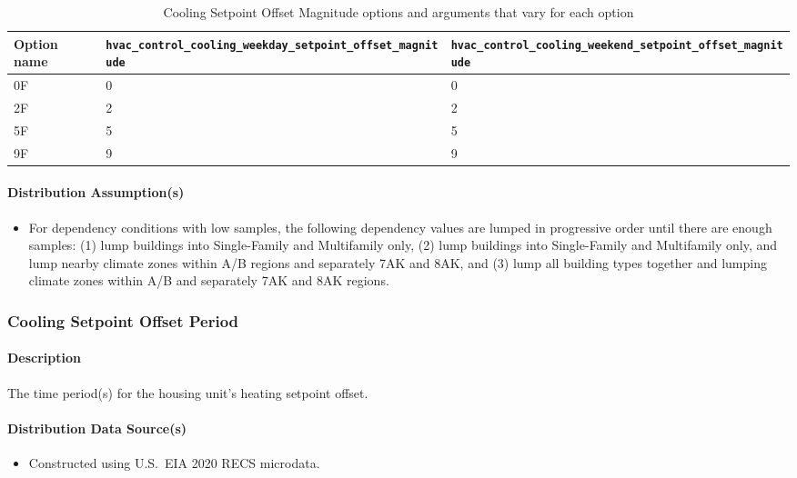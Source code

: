 \begin{longtable}[]{ |p{}|p{4cm}|p{4cm}| }
\caption{Cooling Setpoint Offset Magnitude options and arguments that vary for each option} \label{table:hc_opt_cl_stp_mag} \\  
\toprule\noalign{}
Option name &
\texttt{hvac\_control\_cooling\_weekday\_setpoint\_offset\_magnitude} &
\texttt{hvac\_control\_cooling\_weekend\_setpoint\_offset\_magnitude} \\
\midrule\noalign{}
\endhead
\bottomrule\noalign{}
\endlastfoot
0F & 0 & 0 \\
2F & 2 & 2 \\
5F & 5 & 5 \\
9F & 9 & 9 \\
\end{longtable}

\paragraph{Distribution Assumption(s)}
\begin{itemize}
    \item For dependency conditions with low samples, the following dependency values are lumped in progressive order until there are enough samples: (1) lump buildings into Single-Family and Multifamily only, (2) lump buildings into Single-Family and Multifamily only, and lump nearby climate zones within A/B regions and separately 7AK and 8AK, and (3) lump all building types together and lumping climate zones within A/B and separately 7AK and 8AK regions.
\end{itemize}

\subsubsection{Cooling Setpoint Offset Period}
\paragraph{Description}
The time period(s) for the housing unit's heating setpoint offset.

\paragraph{Distribution Data Source(s)}
\begin{itemize}
    \item Constructed using U.S.~EIA 2020 RECS microdata.
\end{itemize}

